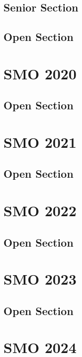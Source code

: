\documentclass[a4paper,listof=totoc,bibliography=totoc,openany]{scrbook}
\begin{document}
\section{Senior Section}



\section{Open Section}




\chapter{SMO 2020}
\section{Open Section}


\chapter{SMO 2021}
\section{Open Section}


\chapter{SMO 2022}
\section{Open Section}



\chapter{SMO 2023}
\section{Open Section}



\chapter{SMO 2024}
\end{document}
